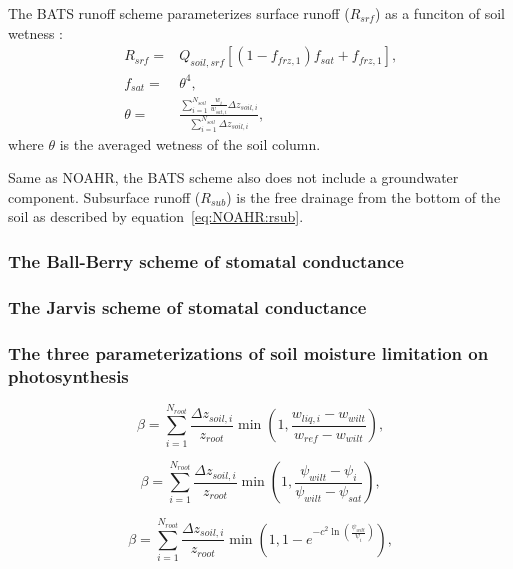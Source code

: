 \documentclass[essd]{copernicus}
\begin{document}
The BATS runoff scheme parameterizes surface runoff (\(R_{srf}\)) as a funciton
of soil wetness \citep{yang1996GPC}:
\begin{align}
    R_{srf} = & Q_{soil,srf} \left[ (1 - f_{frz,1}) f_{sat} + f_{frz,1} \right]
    \text{,} \\
    f_{sat} = & \theta^4 \text{,} \\
    \theta =  & \frac{\sum_{i=1}^{N_{soil}}\frac{w_i}{w_{sat,i}}\Delta
    z_{soil,i}}{\sum_{i=1}^{N_{soil}}\Delta z_{soil,i}} \text{,}
\end{align}
where \(\theta\) is the averaged wetness of the soil column.

Same as NOAHR, the BATS scheme also does not include a groundwater component.
Subsurface runoff (\(R_{sub}\)) is the free drainage from the bottom of the soil
as described by equation~\eqref{eq:NOAHR:rsub}.


\subsubsection{The Ball-Berry scheme of stomatal conductance}


\subsubsection{The Jarvis scheme of stomatal conductance}

\subsubsection{The three parameterizations of soil moisture limitation on
    photosynthesis}

\begin{equation}
    \beta = \sum_{i=1}^{N_{root}} \frac{\Delta z_{soil,i}}{z_{root}}
    \min\left(1, \frac{w_{liq,i} - w_{wilt}}{w_{ref} - w_{wilt}}\right)
    \text{,}
\end{equation}

\begin{equation}
    \beta = \sum_{i=1}^{N_{root}} \frac{\Delta z_{soil,i}}{z_{root}}
    \min\left(1, \frac{\psi_{wilt} - \psi_{i}}{\psi_{wilt} - \psi_{sat}}\right)
    \text{,}
\end{equation}

\begin{equation}
    \beta = \sum_{i=1}^{N_{root}} \frac{\Delta z_{soil,i}}{z_{root}}
    \min\left(1,
    1 - e^{-c^2 \ln\left(\frac{\psi_{wilt}}{\psi_{i}} \right)} \right) \text{,}
\end{equation}
\end{document}
